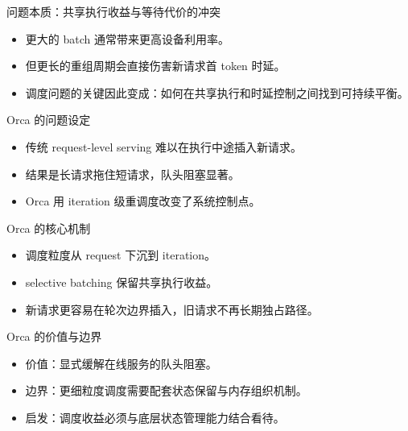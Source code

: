 \begin{frame}{问题本质：共享执行收益与等待代价的冲突}
  \begin{itemize}
    \item 更大的 batch 通常带来更高设备利用率。
    \item 但更长的重组周期会直接伤害新请求首 token 时延。
    \item 调度问题的关键因此变成：如何在共享执行和时延控制之间找到可持续平衡。
  \end{itemize}
\end{frame}

\begin{frame}{Orca 的问题设定}
  \begin{itemize}
    \item 传统 request-level serving 难以在执行中途插入新请求。
    \item 结果是长请求拖住短请求，队头阻塞显著。
    \item Orca 用 iteration 级重调度改变了系统控制点。
  \end{itemize}
\end{frame}

\begin{frame}{Orca 的核心机制}
  \begin{itemize}
    \item 调度粒度从 request 下沉到 iteration。
    \item selective batching 保留共享执行收益。
    \item 新请求更容易在轮次边界插入，旧请求不再长期独占路径。
  \end{itemize}
\end{frame}

\begin{frame}{Orca 的价值与边界}
  \begin{itemize}
    \item 价值：显式缓解在线服务的队头阻塞。
    \item 边界：更细粒度调度需要配套状态保留与内存组织机制。
    \item 启发：调度收益必须与底层状态管理能力结合看待。
  \end{itemize}
\end{frame}

